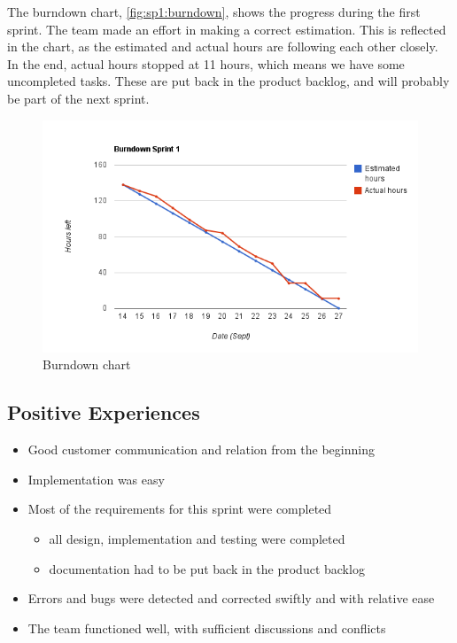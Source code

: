 The burndown chart, \autoref{fig:sp1:burndown}, shows the progress during
the first sprint. The team made an effort in making a correct estimation. This
is reflected in the chart, as the estimated and actual hours are  following
each other closely. In the end, actual hours stopped at 11 hours, which means we
have some uncompleted tasks. These are put back in the product backlog, and will
probably be part of the next sprint. 

\begin{figure}[!htb]
	\includegraphics[width=\textwidth]{./sprints/img/burndown_chart_s1}
	\caption{Burndown chart\label{fig:sp1:burndown}}
\end{figure}

\subsection{Positive Experiences}
\begin{itemize}
	\item Good customer communication and relation from the beginning
	\item Implementation was easy
	\item Most of the requirements for this sprint were completed
	\begin{itemize} 
		\item all design, implementation and testing were completed
		\item documentation had to be put back in the product backlog 
	\end{itemize}
	\item Errors and bugs were detected and corrected swiftly and with relative ease
	\item The team functioned well, with sufficient discussions and conflicts
\end{itemize}


